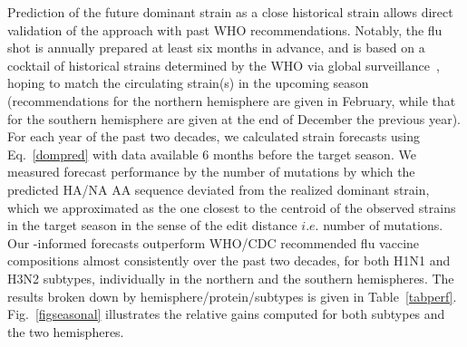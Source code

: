\documentclass[onecolumn, compsoc,10pt]{IEEEtran}
\begin{document}
Prediction of the future dominant strain as  a close historical strain  allows direct validation of the approach with past WHO recommendations. Notably, the flu shot  is annually prepared at least six months in advance, and is based on a cocktail of historical strains determined by the WHO via global surveillance~\cite{agor2018models}, hoping to match the circulating strain(s) in the upcoming  season (recommendations for the northern hemisphere are given in February, while that for the southern hemisphere are given at the end of December the previous year). %
For each year of the past two decades, we calculated strain forecasts using  Eq.~\eqref{dompred} with data available 6 months before the target season. %
We  measured forecast performance by the number of mutations by which the predicted HA/NA AA sequence deviated from the realized dominant strain, which we approximated as the one closest to the centroid of the observed strains in the target season in the sense of the edit distance $i.e.$ number of mutations. Our \enet-informed forecasts outperform  WHO/CDC recommended flu vaccine compositions almost consistently over the past two decades, for both H1N1 and H3N2 subtypes, individually in the northern and the southern hemispheres. %
%
The  results  broken down by hemisphere/protein/subtypes is given in Table~\ref{tabperf}. Fig.~\ref{figseasonal} illustrates the relative gains computed for both subtypes and the two hemispheres. %
\end{document}
